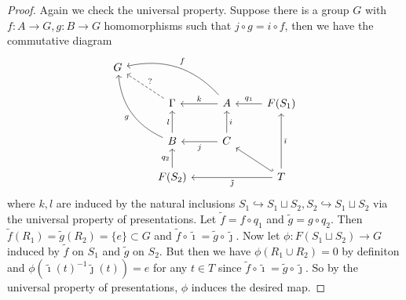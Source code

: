 \begin{proof}
    Again we check the universal property.
    Suppose there is a group $G$ with $f:A\to G,g:B\to G$ homomorphisms such that $j\circ g=i\circ f$, then we have the commutative diagram
    \[
        \begin{tikzcd}
            G&&&\\
            &\Gamma\arrow[swap,dashed]{ul}{?}&A\arrow[swap]{l}{k}\arrow[swap, bend right]{ull}{f}&F(S_1)\arrow[swap]{l}{q_1}\\
            &B\arrow{u}{l}\arrow[bend left]{uul}{g}&C\arrow{l}{j}\arrow[swap]{u}{i}\arrow[hookleftarrow]{dr}&\\
            &F(S_2)\arrow{u}{q_2}&&T\arrow{ll}{\tilde\jmath}\arrow[swap]{uu}{\tilde\imath}
        \end{tikzcd}
    \]
    where $k,l$ are induced by the natural inclusions $S_1\hookrightarrow S_1\sqcup S_2,S_2\hookrightarrow S_1\sqcup S_2$ via the universal property of presentations.
    Let $\tilde{f}=f\circ q_1$ and $\tilde{g}=g\circ q_2$.
    Then $\tilde{f}(R_1)=\tilde{g}(R_2)=\{e\}\subset G$ and $\tilde{f}\circ\tilde\imath=\tilde{g}\circ\tilde\jmath$.
    Now let $\phi:F(S_1\sqcup S_2)\to G$ induced by $\tilde{f}$ on $S_1$ and $\tilde{g}$ on $S_2$.
    But then we have $\phi(R_1\cup R_2)=0$ by definiton and $\phi(\tilde\imath(t)^{-1}\tilde\jmath(t))=e$ for any $t\in T$ since $\tilde{f}\circ\tilde\imath=\tilde{g}\circ\tilde\jmath$.
    So by the universal property of presentations, $\phi$ induces the desired map.
\end{proof}
